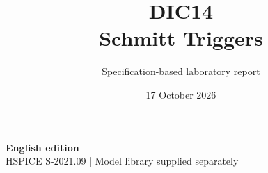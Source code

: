 \documentclass[11pt,a4paper]{article}
\title{\color{accent}DIC14\\[4pt]Schmitt Triggers}
\author{Specification-based laboratory report}
\date{17 October 2026}
\begin{document}
\maketitle
\begin{center}\small\textbf{English edition}\\
HSPICE S-2021.09 \quad | \quad Model library supplied separately
\end{center}


\end{document}
